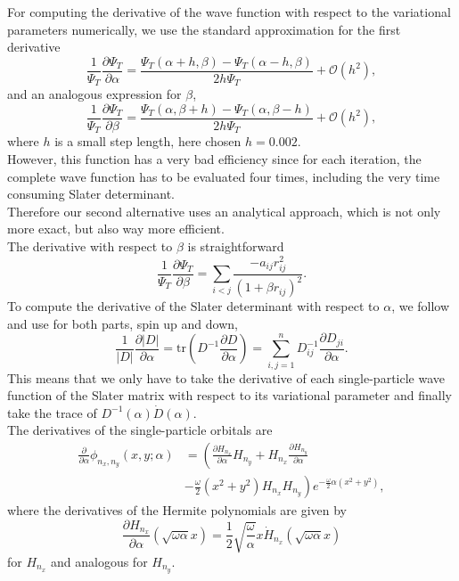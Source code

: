 For computing the derivative of the wave function 
with respect to the variational parameters numerically, we use the standard approximation for the first derivative
\[
\frac{1}{\Psi_T}\frac{\partial \Psi_T}{\partial \alpha} = \frac{\Psi_T(\alpha+h, \beta) - \Psi_T(\alpha-h, \beta)}{2 h \Psi_T} + \mathcal{O}(h^ 2),
\]
and an analogous expression for $\beta$,
\[
\frac{1}{\Psi_T}\frac{\partial \Psi_T}{\partial \beta} = \frac{\Psi_T(\alpha, \beta +h) - \Psi_T(\alpha, \beta-h)}{2 h \Psi_T} + \mathcal{O}(h^ 2),
\]
where $h$ is a small step length, here chosen $h = 0.002$.\\
However, this function has a very bad efficiency since for each iteration, the complete wave function has to be evaluated four times, including the very time consuming Slater determinant.\\
Therefore our second alternative uses  an analytical approach, which is not only more exact, but also way more efficient.\\
The derivative with respect to $\beta$ is straightforward
\[
\frac{1}{\Psi_T}\frac{\partial \Psi_T}{\partial \beta} = \sum\limits_{i<j} \frac{-a_{ij}r_{ij}^2}{\left(1+\beta r_{ij}\right)^2}.
\]
To compute the derivative of the Slater determinant with respect to $\alpha$, we follow \cite{SkriptMorten} and use for both parts, spin up and down,
\[
\frac{1}{|D|}\frac{\partial |D|}{\partial \alpha} = \text{tr}\left(D^{-1}\frac{\partial D}{\partial \alpha}\right) = \sum\limits_{i,j = 1}^n D_{ij}^{-1}\frac{\partial D_{ji}}{\partial \alpha}.
\]
This means that we only have to take the derivative of each single-particle wave function of the Slater matrix with respect to its variational parameter and finally take the trace of $D^{-1}(\alpha)\dot{D}(\alpha)$.\\
The derivatives of the single-particle orbitals are
\begin{align*}
\frac{\partial}{\partial \alpha} \phi_{n_x,n_y}(x,y;\alpha) &= \left(\frac{\partial H_{n_x}}{\partial \alpha} H_{n_y} + H_{n_x}\frac{\partial H_{n_y}}{\partial \alpha} \right.\\
 &\left.-\frac{\omega}{2}\left(x^ 2+y^ 2\right)H_{n_x}H_{n_y}\right)e^{-\frac{\omega}{2}\alpha(x^2+y^2)},
\end{align*}
where the derivatives of the Hermite polynomials are given by
\[
\frac{\partial H_{n_x}}{\partial \alpha}\left(\sqrt{\omega\alpha}x\right) = \frac{1}{2}\sqrt{\frac{\omega}{\alpha}}x \dot{H}_{n_x}\left(\sqrt{\omega\alpha}x\right)
\]
for $H_{n_x}$ and analogous for $H_{n_y}$.

